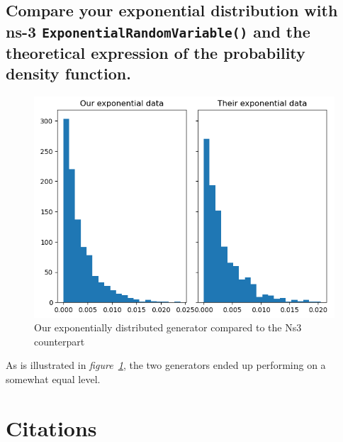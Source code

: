 \documentclass[a4paper, titlepage,12pt]{article}
\begin{document}
		\subsection{Compare your exponential distribution with ns-3 \lstinline{ExponentialRandomVariable()} and the theoretical expression of the probability density function.}
		\begin{figure}[h!]
			\begin{center}
				\includegraphics[scale=0.8]{./exponential_histogram_plot.png}
				\caption{Our exponentially distributed generator compared to the Ns3 counterpart}
				\label{exp_plots}
			\end{center}
		\end{figure}
		As is illustrated in \textit{figure~\ref{exp_plots}}, the two generators ended up performing on a somewhat equal level.

		\section*{Citations}
			\printbibliography
\end{document}
